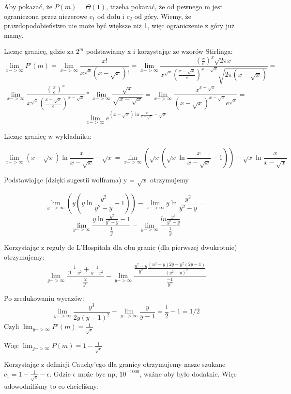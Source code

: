 \documentclass[12pt,a4paper]{article}
\begin{document}
Aby pokazać, że $P(m) = \Theta(1)$, trzeba pokazać, że od pewnego m jest ograniczona przez niezerowe $c_1$ od dołu i $c_2$ od góry. Wiemy, że prawdopodobieństwo nie może być większe niż 1, więc ograniczenie z góry już mamy. 

Licząc granicę, gdzie za $2^m$ podstawiamy x i korzystając ze wzorów Stirlinga:
$$\lim_{x->\infty} P'(m) = \lim_{x->\infty} \frac{x!}{x^{\sqrt{x}}(x-\sqrt{x})!} = \lim_{x->\infty} \frac{(\frac{x}{e})^x \sqrt{2\pi x}}{x^{\sqrt{x}} (\frac{x-\sqrt{x}}{e})^{x-\sqrt{x}} \sqrt{2\pi(x-\sqrt{x})}} =$$
$$ \lim_{x->\infty} \frac{(\frac{x}{e})^x}{x^{\sqrt{x}} (\frac{x-\sqrt{x}}{e})^{x-\sqrt{x}}} * \lim_{x->\infty} \frac{\sqrt{x}}{\sqrt{x-\sqrt{x}}} = \lim_{x->\infty} \frac{x^{x-\sqrt{x}}}{({x-\sqrt{x}})^{x-\sqrt{x}} e^{\sqrt{x}}} = $$
$$\lim_{x->\infty} e^{(x-\sqrt{x}) \ln{\frac{x}{x-\sqrt{x}}}-\sqrt{x}}$$

Licząc granicę w wykładniku:

$$\lim_{x->\infty} (x-\sqrt{x}) \ln{\frac{x}{x-\sqrt{x}}}-\sqrt{x} = \lim_{x->\infty} (\sqrt{x} (\sqrt{x} \ln{\frac{x}{x-\sqrt{x}}}-1)) - \sqrt{x}\ln{\frac{x}{x-\sqrt{x}}}$$

Podstawiając (dzięki sugestii wolframa) y = $\sqrt{x}$ otrzymujemy

$$ \lim_{y->\infty} (y (y \ln{\frac{y^2}{y^2-y}}-1)) - \lim_{x->\infty} y\ln{\frac{y^2}{y^2-y}} = $$
$$ \lim_{y->\infty} \frac{y\ln{\frac{y^2}{y^2-y}}-1}{\frac{1}{y}} - \lim_{y->\infty} \frac{ln{\frac{y^2}{y^2-y}}}{\frac{1}{y}}$$

Korzystając z reguły de L'Hospitala dla obu granic (dla pierwszej dwukrotnie) otrzymujemy:
$$ \lim_{y->\infty} \frac{\frac{1}{(1-y^2}+\frac{1}{y-y^2}}{\frac{2}{y^3}} - \lim_{y->\infty} \frac{\frac{y^2-y}{y^2}\frac{(u^2-y)2y-y^2(2y-1)}{(y^2-y)^2}}{\frac{-1}{y^2}}$$

Po zredukowaniu wyrazów:
$$ \lim_{y->\infty} \frac{y^3}{2y(y-1)^2}- \lim_{y->\infty} \frac{y}{y-1} = \frac{1}{2} - 1  = 1/2$$
Czyli $ \lim_{y->\infty} P'(m) = \frac{1}{\sqrt{e}}$

Więc $ \lim_{y->\infty} P(m) = 1 - \frac{1}{\sqrt{e}}$

Korzystając z definicji Cauchy'ego dla granicy otrzymujemy nasze szukane $c_1 = 1 - \frac{1}{\sqrt{e}} - \epsilon$. Gdzie $\epsilon$ może byc np, $10^{-1000}$, ważne aby było dodatnie. Więc udowodniliśmy to co chcieliśmy. 
\end{document}
